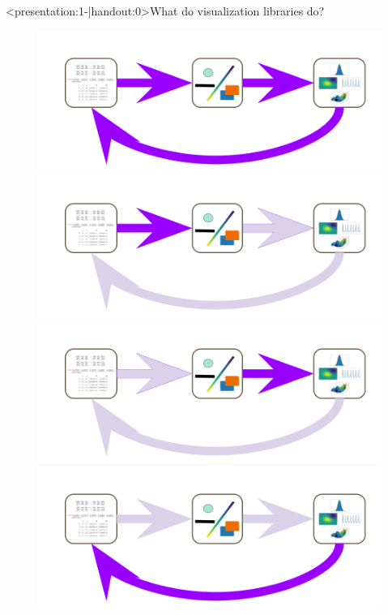 \documentclass[xcolor={dvipsnames}]{beamer}
\begin{document}
\begin{frame}<presentation:1-|handout:0>{What do visualization libraries do?}
    \begin{figure}
        \begin{overprint}
            \includegraphics[width=\linewidth]{figures/flow/s2.png}
            \includegraphics[width=\linewidth]{figures/flow/s_vc.png}
            \includegraphics[width=\linewidth]{figures/flow/s_mark.png}
            \includegraphics[width=\linewidth]{figures/flow/s3.png}
        \end{overprint}
    \end{figure}
\end{frame}
\end{document}
